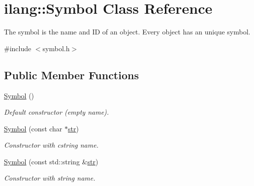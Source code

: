 \hypertarget{classilang_1_1_symbol}{}\section{ilang\+:\+:Symbol Class Reference}
\label{classilang_1_1_symbol}


The symbol is the name and ID of an object. Every object has an unique symbol.  




{\ttfamily \#include $<$symbol.\+h$>$}

\subsection*{Public Member Functions}
\begin{DoxyCompactItemize}
\item 
\mbox{\label{classilang_1_1_symbol_aad108f719d4057fa5a4d6d1c3b2b34e3}} 
\mbox{\hyperlink{classilang_1_1_symbol_aad108f719d4057fa5a4d6d1c3b2b34e3}{Symbol}} ()
\begin{DoxyCompactList}\small\item\em Default constructor (empty name). \end{DoxyCompactList}\item 
\mbox{\label{classilang_1_1_symbol_a022b68ff8c9d7be4b1480941c81f675d}} 
\mbox{\hyperlink{classilang_1_1_symbol_a022b68ff8c9d7be4b1480941c81f675d}{Symbol}} (const char $\ast$\mbox{\hyperlink{classilang_1_1_symbol_a268f38293a5538cb1da7dc7cc36a8940}{str}})
\begin{DoxyCompactList}\small\item\em Constructor with cstring name. \end{DoxyCompactList}\item 
\mbox{\label{classilang_1_1_symbol_a5ccc60921db781e23ebad99b4387614f}} 
\mbox{\hyperlink{classilang_1_1_symbol_a5ccc60921db781e23ebad99b4387614f}{Symbol}} (const std\+::string \&\mbox{\hyperlink{classilang_1_1_symbol_a268f38293a5538cb1da7dc7cc36a8940}{str}})
\begin{DoxyCompactList}\small\item\em Constructor with string name. \end{DoxyCompactList}\item 
\mbox{\label{classilang_1_1_symbol_a89c64866ed5cb913bed047354ad24e7f}} 

\end{DoxyCompactItemize}
